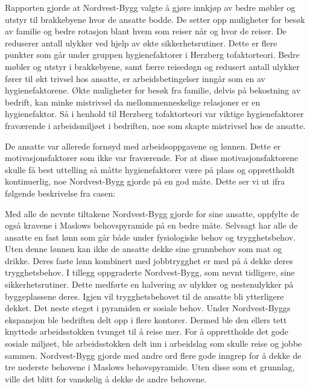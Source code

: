 \documentclass[norsk]{article}
\begin{document}
Rapporten gjorde at Nordvest-Bygg valgte å gjøre innkjøp av bedre møbler og utstyr til brakkebyene hvor de ansatte bodde. De setter opp muligheter for besøk av familie og bedre rotasjon blant hvem som reiser når og hvor de reiser. De reduserer antall ulykker ved hjelp av økte sikkerhetsrutiner. Dette er flere punkter som går under gruppen hygienefaktorer i Herzberg tofaktorteori. Bedre møbler og utstyr i brakkebyene, samt færre reisedøgn og redusert antall ulykker fører til økt trivsel hos ansatte, er arbeidsbetingelser inngår som en av hygienefaktorene. Økte muligheter for besøk fra familie, delvis på bekostning av bedrift, kan minke mistrivsel da mellommenneskelige relasjoner er en hygienefaktor. Så i henhold til Herzberg tofaktorteori var viktige hygienefaktorer fraværende i arbeidsmiljøet i bedriften, noe som skapte mistrivsel hos de ansatte.

De ansatte var allerede fornøyd med arbeidsoppgavene og lønnen. Dette er motivasjonsfaktorer som ikke var fraværende. For at disse motivasjonsfaktorene skulle få best uttelling så måtte hygienefaktorer være på plass og opprettholdt kontinuerlig, noe Nordvest-Bygg gjorde på en god måte. Dette ser vi ut ifra følgende beskrivelse fra casen:


Med alle de nevnte tiltakene Nordvest-Bygg gjorde for sine ansatte, oppfylte de også kravene i Maslows behovspyramide på en bedre måte. Selvsagt har alle de ansatte en fast lønn som går både under fysiologiske behov og trygghetsbehov. Uten denne lønnen kan ikke de ansatte dekke sine grunnbehov som mat og drikke. Deres faste lønn kombinert med jobbtrygghet er med på å dekke deres trygghetsbehov. I tillegg oppgraderte Nordvest-Bygg, som nevnt tidligere, sine sikkerhetsrutiner. Dette medførte en halvering av ulykker og nestenulykker på byggeplassene deres. Igjen vil trygghetsbehovet til de ansatte bli ytterligere dekket. Det neste steget i pyramiden er sosiale behov. Under Nordvest-Byggs ekspansjon ble bedriften delt opp i flere kontorer. Dermed ble den ellers tett knyttede arbeidsstokken tvunget til å reise mer. For å opprettholde det gode sosiale miljøet, ble arbeidsstokken delt inn i arbeidslag som skulle reise og jobbe sammen. Nordvest-Bygg gjorde med andre ord flere gode inngrep for å dekke de tre nederste behovene i Maslows behovspyramide. Uten disse som et grunnlag, ville det blitt for vanskelig å dekke de andre behovene.
\end{document}
